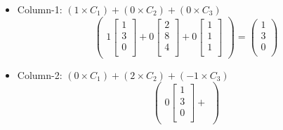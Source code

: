 \documentclass[a4paper,11pt]{article}
\numberwithin{equation}{section}
\begin{document}
\begin{itemize}
\begin{itemize}
                \begin{itemize}
                    \item Column-1:
                    $(1 \times C_1) + (0 \times C_2) + (0 \times C_3)$
                    \[
                    \begin{pmatrix}
                        1
                        \begin{bmatrix}
                            1 \\
                            3\\
                            0\\
                        \end{bmatrix}+
                        0
                        \begin{bmatrix}
                            2\\
                            8\\
                            4\\
                        \end{bmatrix}+
                        0
                        \begin{bmatrix}
                            1\\
                            1\\
                            1\\
                        \end{bmatrix}
                    \end{pmatrix}
                    =
                    \begin{pmatrix}
                        1\\
                        3\\
                        0\\
                    \end{pmatrix}
                    \]
                    \item Column-2:
                    $(0 \times C_1) + (2 \times C_2) + (-1 \times C_3)$
                    \[
                    \begin{pmatrix}
                        0
                        \begin{bmatrix}
                            1 \\
                            3\\
                            0\\
                        \end{bmatrix}+

\end{pmatrix}\]
\end{itemize}
\end{itemize}
\end{itemize}
\end{document}
